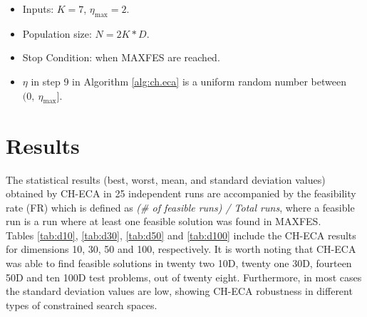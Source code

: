 \documentclass[conference]{IEEEtran}
\begin{document}
\begin{itemize}
	\item Inputs: $K = 7$, $\eta_{\max} = 2$. 
	\item Population size: $N = 2K * D$.
	\item Stop Condition: when MAXFES are reached.
	\item $\eta$ in step 9 in Algorithm \ref{alg:ch.eca} is a uniform random 
		  number between $(0,\ \eta_{\max} ]$.
\end{itemize}




\section{Results} %
\label{sec:results}

The statistical results (best, worst, mean, and standard deviation values) obtained 
by CH-ECA in 25 independent runs are accompanied by the feasibility rate (FR) 
which is defined as \textit{(\# of feasible runs) / Total runs}, where a feasible 
run is a run where at least one feasible solution was found in MAXFES.\\
% 

Tables \ref{tab:d10}, \ref{tab:d30}, \ref{tab:d50} and \ref{tab:d100} include the 
CH-ECA results for dimensions 10, 30, 50 and 100, respectively. It is worth noting 
that CH-ECA was able to find feasible solutions in twenty two 10D, twenty one 30D, 
fourteen 50D and ten 100D test problems, out of twenty eight. Furthermore, in most 
cases the standard deviation values are low, showing CH-ECA robustness in different 
types of constrained search spaces.\\
% 
\end{document}
